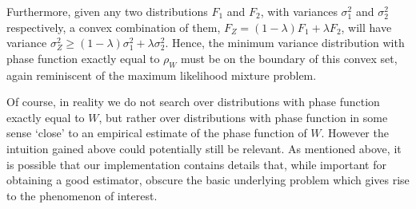 Furthermore, given any two distributions $F_1$ and $F_2$, with variances $\sigma_1^2$ and $\sigma_2^2$ respectively, a convex combination of them, $F_Z = (1 - \lambda)F_1 + \lambda F_2$, will have variance $\sigma_Z^2 \geq (1 - \lambda) \sigma_1^2 + \lambda \sigma_2^2$. Hence, the minimum variance distribution with phase function exactly equal to $\rho_W$ must be on the boundary of this convex set, again reminiscent of the maximum likelihood mixture problem.





Of course, in reality we do not search over distributions with phase function exactly equal to $W$, but rather over distributions with phase function in some sense `close' to an empirical estimate of the phase function of $W$. However the intuition gained above could potentially still be relevant. As mentioned above, it is possible that our implementation contains details that, while important for obtaining a good estimator, obscure the basic underlying problem which gives rise to the phenomenon of interest.






